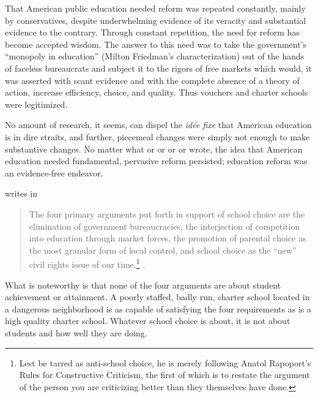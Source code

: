 That American public education needed reform was repeated constantly, mainly by conservatives, despite underwhelming evidence of its veracity and substantial evidence to the contrary. Through constant repetition, the need for reform has become accepted wisdom. The answer to this need was to take the government's ``monopoly in education'' (Milton Friedman's characterization) out of the hands of faceless bureaucrats and subject it to the rigors of free markets which would, it was asserted with scant evidence and with the complete absence of a theory of action, increase efficiency, choice, and quality. Thus vouchers and charter schools were legitimized.

No amount of research, it seems, can dispel the \textit{idée fixe} that American education is in dire straits, and further, piecemeal changes were simply not enough to make substantive changes. No matter what \textcite{Henig1994} or \textcite{Berliner.Biddle1997} or \textcite{Nichols.etal2007} or \textcite{Glass2008} or \textcite{Berliner.Glass2014} wrote, the idea that American education needed fundamental, pervasive reform persisted; education reform was an evidence-free endeavor.

\citeauthor{Garcia2018} writes in 
\begin{quotation}\noindent
The four primary arguments put forth in support of school choice are the elimination of government bureaucracies, the interjection of competition into education through market forces, the promotion of parental choice as the most granular form of local control, and school choice as the ``new'' civil rights issue of our time.\footnote{Lest \citeauthor{Garcia2018} be tarred as anti-school choice, he is merely following Anatol Rapoport's Rules for Constructive Criticism, the first of which is to restate the argument of the person you are criticizing better than they themselves have done.} \parencite[55]{Garcia2018}.
\end{quotation}
What is noteworthy is that none of the four arguments are about student achievement or attainment. A poorly staffed, badly run, charter school located in a dangerous neighborhood is as capable of satisfying the four requirements as is a high quality charter school. Whatever school choice is about, it is not about students and how well they are doing.

